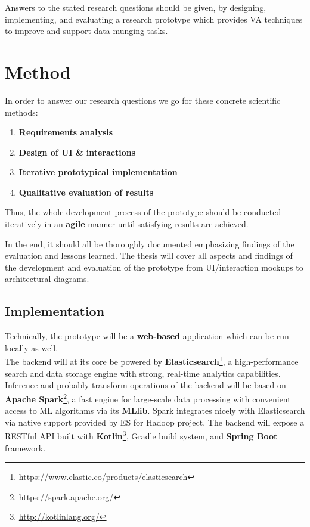 Answers to the stated research questions should be given, by designing, implementing, and evaluating a research prototype which provides VA techniques to improve and support data munging tasks.


\section{Method}
In order to answer our research questions we go for these concrete scientific methods:

\begin{enumerate}
  \item \textbf{Requirements analysis}
  \item \textbf{Design of UI \& interactions}
  \item \textbf{Iterative prototypical implementation}
  \item \textbf{Qualitative evaluation of results}
\end{enumerate}

Thus, the whole development process of the prototype should be conducted iteratively in an \textbf{agile} manner until satisfying results are achieved.

In the end, it should all be thoroughly documented emphasizing findings of the evaluation and lessons learned. The thesis will cover all aspects and findings of the development and evaluation of the prototype from UI/interaction mockups to architectural diagrams.

\subsection{Implementation}
Technically, the prototype will be a \textbf{web-based} application which can be run locally as well.
\\

The backend will at its core be powered by \textbf{Elasticsearch}\footnote{\href{https://www.elastic.co/products/elasticsearch}{https://www.elastic.co/products/elasticsearch}}, a high-performance search and data storage engine with strong, real-time analytics capabilities. Inference and probably transform operations of the backend will be based on \textbf{Apache Spark}\footnote{\href{https://spark.apache.org/}{https://spark.apache.org/}}, a fast engine for large-scale data processing with convenient access to ML algorithms via its \textbf{MLlib}. Spark integrates nicely with Elasticsearch via native support provided by ES for Hadoop project. The backend will expose a RESTful API built with \textbf{Kotlin}\footnote{\href{http://kotlinlang.org/}{http://kotlinlang.org/}}, Gradle build system, and \textbf{Spring Boot} framework.

